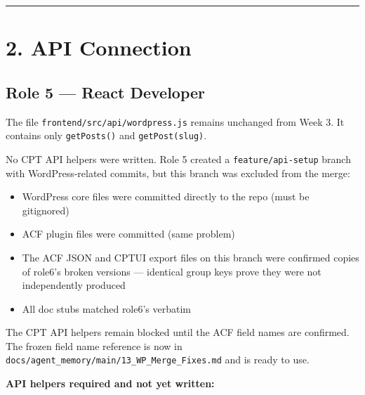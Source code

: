 \documentclass[12pt,a4paper]{article}
\begin{document}
\medskip\noindent\textcolor{uvtYellow}{\rule{\textwidth}{1.2pt}}\medskip

\section{2. API Connection}\label{api-connection}

\subsection{Role 5 --- React Developer}\label{role-5-react-developer-1}

The file \texttt{frontend/src/api/wordpress.js} remains unchanged from
Week 3. It contains only \texttt{getPosts()} and \texttt{getPost(slug)}.

No CPT API helpers were written. Role 5 created a
\texttt{feature/api-setup} branch with WordPress-related commits, but
this branch was excluded from the merge:

\begin{itemize}
\item
  WordPress core files were committed directly to the repo (must be
  gitignored)
\item
  ACF plugin files were committed (same problem)
\item
  The ACF JSON and CPTUI export files on this branch were confirmed
  copies of role6's broken versions --- identical group keys prove they
  were not independently produced
\item
  All doc stubs matched role6's verbatim
\end{itemize}

The CPT API helpers remain blocked until the ACF field names are
confirmed. The frozen field name reference is now in
\texttt{docs/agent\_memory/main/13\_WP\_Merge\_Fixes.md} and is ready to
use.

\textbf{API helpers required and not yet written:}
\end{document}
